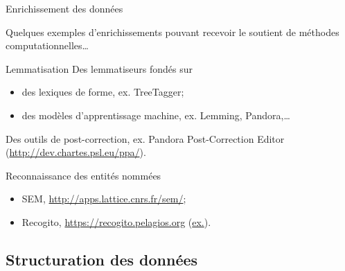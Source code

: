 \documentclass[ignorenonframetext]{beamer}
\begin{document}
\begin{frame}{Enrichissement des données}

Quelques exemples d'enrichissements pouvant recevoir le soutient de méthodes computationnelles…

\begin{block}{Lemmatisation}
Des lemmatiseurs fondés sur
	\begin{itemize}
		\item des lexiques de forme, ex. TreeTagger;
		\item des modèles d'apprentissage machine, ex. Lemming, Pandora,…
	\end{itemize}
Des outils de post-correction, ex. Pandora Post-Correction Editor (\url{http://dev.chartes.psl.eu/ppa/}).
\end{block}


\begin{block}{Reconnaissance des entités nommées}
	\begin{itemize}
		\item SEM, \url{http://apps.lattice.cnrs.fr/sem/};
		\item Recogito, \url{https://recogito.pelagios.org} (\href{https://recogito.pelagios.org/document/qgehu36kmc3bdz/part/1/edit}{ex.}).
	\end{itemize}
\end{block}


\end{frame}


\subsection{Structuration des données}

\end{document}
